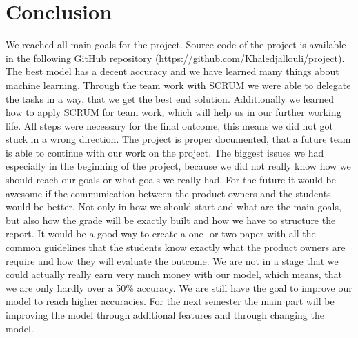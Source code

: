 
\chapter{Conclusion}
\label{chap:conclusion}
We reached all main goals for the project. Source code of the project is available in the following GitHub repository (\url{https://github.com/Khaledjallouli/project}). The best model has a decent accuracy and we have learned many things about machine learning. Through the team work with SCRUM we were able to delegate the tasks in a way, that we get the best end solution. Additionally we learned how to apply SCRUM for team work, which will help us in our further working life. All steps were necessary for the final outcome, this means we did not got stuck in a wrong direction. The project is proper documented, that a future team is able to continue with our work on the project. The biggest issues we had especially in the beginning of the project, because we did not really know how we should reach our goals or what goals we really had. For the future it would be awesome if the communication between the product owners and the students would be better. Not only in how we should start and what are the main goals, but also how the grade will be exactly built and how we have to structure the report. It would be a good way to create a one- or two-paper with all the common guidelines that the students know exactly what the product owners are require and how they will evaluate the outcome. We are not in a stage that we could actually really earn very much money with our model, which means, that we are only hardly over a 50\% accuracy. We are still have the goal to improve our model to reach higher accuracies. For the next semester the main part will be improving the model through additional features and through changing the model.

